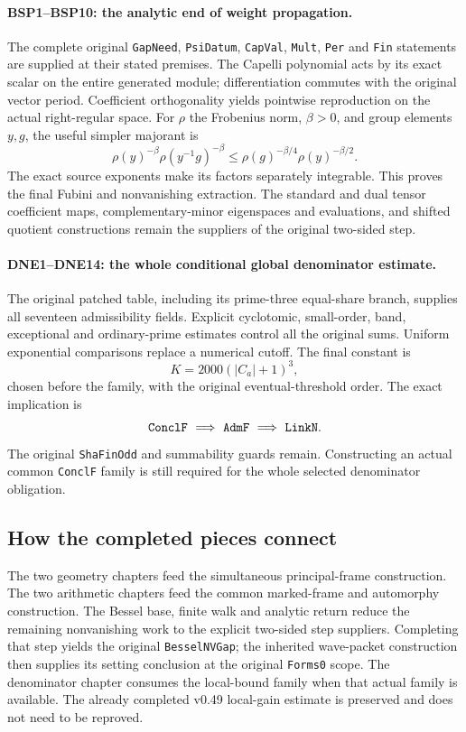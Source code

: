 \documentclass[11pt,a4paper]{article}
\numberwithin{equation}{section}
\theoremstyle{remark}\newtheorem{remark}[theorem]{Remark}
\begin{document}
\paragraph{BSP1--BSP10: the analytic end of weight propagation.}
The complete original \texttt{Gap\allowbreak Need}, \texttt{Psi\allowbreak Datum},
\texttt{Cap\allowbreak Val}, \texttt{Mult}, \texttt{Per} and
\texttt{Fin} statements are supplied at their stated premises.
The Capelli polynomial acts by its exact scalar on the entire generated
module; differentiation commutes with the original vector period.
Coefficient orthogonality yields pointwise reproduction on the actual
right-regular space. For $\rho$ the Frobenius norm, $\beta>0$, and
group elements $y,g$, the useful simpler majorant is
\[
 \rho(y)^{-\beta}\rho(y^{-1}g)^{-\beta}
 \le \rho(g)^{-\beta/4}\rho(y)^{-\beta/2}.
\]
The exact source exponents make its factors separately integrable.
This proves the final Fubini and nonvanishing extraction. The standard
and dual tensor coefficient maps, complementary-minor eigenspaces and
evaluations, and shifted quotient constructions remain the suppliers
of the original two-sided step.

\paragraph{DNE1--DNE14: the whole conditional global denominator estimate.}
The original patched table, including its prime-three equal-share
branch, supplies all seventeen admissibility fields. Explicit
cyclotomic, small-order, band, exceptional and ordinary-prime estimates
control all the original sums. Uniform exponential comparisons replace
a numerical cutoff. The final constant is
\[
                    K=2000(|C_a|+1)^3,
\]
chosen before the family, with the original eventual-threshold order.
The exact implication is
\[
 \texttt{Concl\allowbreak F}\ \Longrightarrow\ \texttt{Adm\allowbreak F}
                  \ \Longrightarrow\ \texttt{Link\allowbreak N}.
\]
The original \texttt{Sha\allowbreak Fin\allowbreak Odd} and summability guards remain.
Constructing an actual common \texttt{Concl\allowbreak F} family is still required
for the whole selected denominator obligation.

\subsection{How the completed pieces connect}

The two geometry chapters feed the simultaneous principal-frame
construction. The two arithmetic chapters feed the common marked-frame
and automorphy construction. The Bessel base, finite walk and analytic
return reduce the remaining nonvanishing work to the explicit
two-sided step suppliers. Completing that step yields the original
\texttt{Bessel\allowbreak NVGap}; the inherited wave-packet construction then
supplies its setting conclusion at the original \texttt{Forms0} scope.
The denominator chapter consumes the local-bound family when that
actual family is available. The already completed v0.49 local-gain
estimate is preserved and does not need to be reproved.
\end{document}
